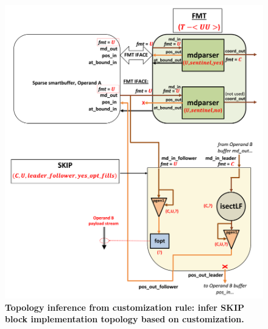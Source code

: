 \begin{figure}[ht]
\includegraphics[width=\textwidth]{figures/safinference_build_11skiptopology.png}
\caption{\textbf{ Topology inference from customization rule: infer SKIP block implementation topology based on customization.}}
\label{fig:safinference_build_11skiptopology}
\centering
\end{figure}

